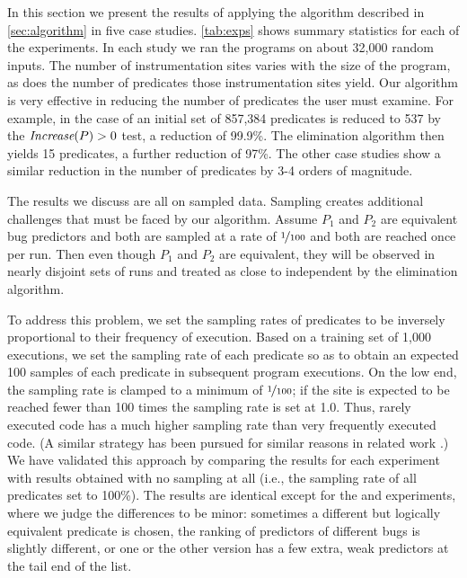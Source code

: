 


In this section we present the results of applying the algorithm
described in \autoref{sec:algorithm} in five case
studies.  \autoref{tab:exps} shows summary statistics for each of the
experiments.  In each study we ran the programs on about 32,000 random
inputs.  The number of instrumentation sites varies with the size of
the program, as does the number of predicates those instrumentation
sites yield.  Our algorithm is very effective in reducing the number
of predicates the user must examine.  For example, in the case of
\rhythmbox an initial set of 857,384 predicates is reduced to 537 by the $\textit{Increase}(P) > 0$
test, a reduction of 99.9\%.  The elimination algorithm then yields 15 predicates, a further
reduction of 97\%.  The other case studies show a similar reduction in the number of
predicates by 3-4 orders of magnitude.

The results we discuss are all on sampled data.  Sampling creates
additional challenges that must be faced by our algorithm.  Assume $P_1$ and $P_2$ are
equivalent bug predictors and both are sampled at a rate of
$\nicefrac{1}{100}$ and both are reached once per run.  Then even though
$P_1$ and $P_2$ are equivalent, they will be observed in nearly disjoint
sets of runs and treated as close to independent by the elimination
algorithm.

To address this problem, we set the sampling rates of predicates to be
inversely proportional to their frequency of execution.  Based on a
training set of 1,000 executions, we set the sampling rate of each predicate so
as to obtain an expected 100 samples of each predicate in subsequent program
executions.  On the low end, the sampling rate is clamped to a minimum of $\nicefrac{1}{100}$; if the site is expected to be reached fewer than 100 times the sampling rate is set at 1.0.
Thus, rarely executed code has a
much higher sampling rate than very frequently executed code.  (A
similar strategy has been pursued for similar reasons in related work \cite{chil04}.)  We
have validated this approach by comparing the results for each
experiment with results obtained with no sampling at all (i.e., the
sampling rate of all predicates set to 100\%).  The results are
identical except for the \rhythmbox and \moss experiments, where we
judge the differences to be minor: sometimes a different but logically
equivalent predicate is chosen, the ranking of predictors of different
bugs is slightly different, or one or the other version has a few
extra, weak predictors at the tail end of the list.

